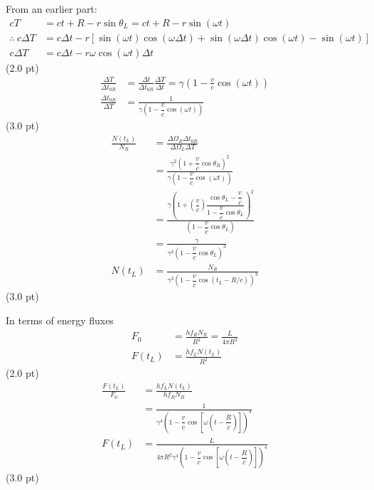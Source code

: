 \begin{description}
  From an earlier part:
  \begin{align*}
    cT &= ct + R - r\sin\theta_L = ct + R - r\sin(\omega t)\\
    \therefore\ c\Delta T &= c\Delta t
      - r\left[\sin(\omega t)\cos(\omega\Delta t)
      + \sin(\omega\Delta t)\cos(\omega t) - \sin(\omega t)\right]\\
    c\Delta T &= c\Delta t - r\omega\cos(\omega t)\Delta t
  \end{align*}
  \hfill(2.0 pt)
  \begin{align*}
    \frac{\Delta T}{\Delta t_{0R}}
      &= \frac{\Delta t}{\Delta t_{0R}}\frac{\Delta T}{\Delta t}
       = \gamma\left(1 - \frac{v}{c}\cos(\omega t)\right)\\
    \frac{\Delta t_{0R}}{\Delta T}
      &= \frac{1}{\gamma\left(1 - \dfrac{v}{c}\cos(\omega t)\right)}
  \end{align*}
  \hfill(3.0 pt)
  \begin{align*}
    \frac{N(t_L)}{N_R}
      &= \frac{\Delta\Omega_R\Delta t_{0R}}{\Delta\Omega_L\Delta T}\\
      &= \frac{\gamma^2\left(1 + \dfrac{v}{c}\cos\theta_R\right)^2}
              {\gamma\left(1 - \dfrac{v}{c}\cos(\omega t)\right)}\\
      &= \frac{\gamma\left(1 + \left(\dfrac{v}{c}\right)
          \dfrac{\cos\theta_L - \dfrac{v}{c}}
                {1 - \dfrac{v}{c}\cos\theta_L}\right)^2}
              {\left(1 - \dfrac{v}{c}\cos\theta_L\right)}\\
      &= \frac{\gamma}
              {\gamma^4\left(1 - \dfrac{v}{c}\cos\theta_L\right)^3}\\
    N(t_L) &= \frac{N_R}
      {\gamma^3\left(1 - \dfrac{v}{c}\cos\left(t_L - R/c\right)\right)^3}
  \end{align*}
  \hfill(3.0 pt)

  In terms of energy fluxes
  \begin{align*}
    F_0 &= \frac{hf_R N_R}{R^2} = \frac{L}{4\pi R^2}\\
    F(t_L) &= \frac{hf_L N(t_L)}{R^2}
  \end{align*}
  \hfill(2.0 pt)
  \begin{align*}
    \frac{F(t_L)}{F_0} &= \frac{hf_L N(t_L)}{hf_R N_R}\\
      &= \frac{1}{\gamma^4\left(1 - \dfrac{v}{c}
         \cos\left[\omega\left(t - \dfrac{R}{c}\right)\right]\right)^4}\\
    F(t_L) &= \frac{L}{4\pi R^2\gamma^4\left(1 - \dfrac{v}{c}
      \cos\left[\omega\left(t - \dfrac{R}{c}\right)\right]\right)^4}
  \end{align*}
  \hfill(3.0 pt)


\end{description}
